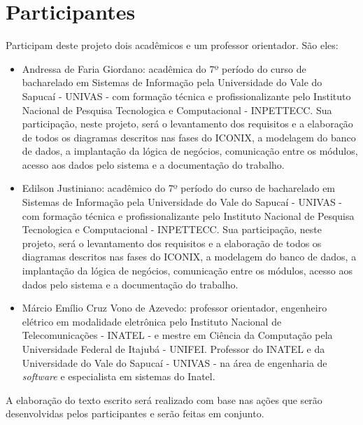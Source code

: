 \section{Participantes}

\par Participam deste projeto dois acadêmicos e um professor orientador. São eles:

\begin{itemize}
	\item Andressa de Faria Giordano: acadêmica do 7º período do curso de bacharelado em Sistemas de Informação pela Universidade do Vale do Sapucaí - UNIVAS - com formação técnica e profissionalizante pelo Instituto Nacional de Pesquisa Tecnologica e Computacional - INPETTECC. Sua participação, neste projeto, será o levantamento dos requisitos e a elaboração de todos os diagramas descritos nas fases do ICONIX, a modelagem do banco de dados, a implantação da lógica de negócios, comunicação entre os módulos, acesso aos dados pelo sistema e a documentação do trabalho.
	
	\item Edilson Justiniano: acadêmico do 7º período do curso de bacharelado em Sistemas de Informação pela Universidade do Vale do Sapucaí - UNIVAS - com formação técnica e profissionalizante pelo Instituto Nacional de Pesquisa Tecnologica e Computacional - INPETTECC. Sua participação, neste projeto, será o levantamento dos requisitos e a elaboração de todos os diagramas descritos nas fases do ICONIX, a modelagem do banco de dados, a implantação da lógica de negócios, comunicação entre os módulos, acesso aos dados pelo sistema e a documentação do trabalho.
	
	\item Márcio Emílio Cruz Vono de Azevedo: professor orientador, engenheiro elétrico em modalidade eletrônica pelo Instituto Nacional de Telecomunicações - INATEL - e mestre em Ciência da Computação pela Universidade Federal de Itajubá - UNIFEI. Professor do INATEL e da Universidade do Vale do Sapucaí - UNIVAS - na área de engenharia de \textit{software} e especialista em sistemas do Inatel.
\end{itemize}

\par A elaboração do texto escrito será realizado com base nas ações que serão desenvolvidas pelos participantes e serão feitas em conjunto.
